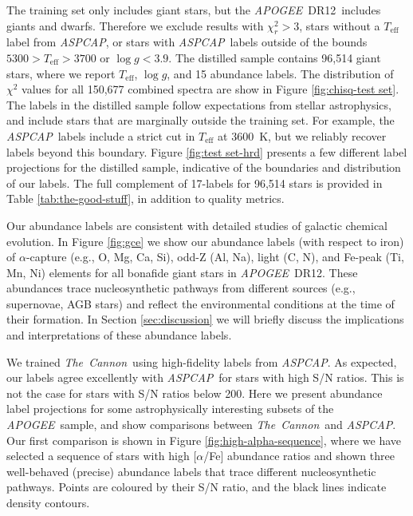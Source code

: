 \documentclass[12pt,preprint]{aastex}
\newcommand{\project}[1]{\textsl{#1}}
\newcommand{\TheCannon}{\project{The~Cannon}}
\newcommand{\acronym}[1]{{\small{#1}}}
\newcommand{\apogee}{\project{\acronym{APOGEE}}}
\newcommand{\aspcap}{\project{\acronym{ASPCAP}}}
\newcommand{\dr}{\acronym{DR12}}
\newcommand{\logg}{\log g}
\newcommand{\Teff}{T_{\mathrm{eff}}}
\begin{document}
The training set only includes giant stars, but the \apogee\ \dr\ includes 
giants and dwarfs.  Therefore we exclude results with $\chi_r^2 > 3$, stars without a $\Teff$ label from \aspcap, or stars with \aspcap\ labels outside of the bounds $5300 > \Teff > 3700$ or $\logg < 3.9$.
The distilled sample contains 96,514 giant stars, where we report $\Teff$,
$\logg$, and 15 abundance labels.  The distribution of $\chi^2$ values for
all 150,677 combined spectra are show in Figure \ref{fig:chisq-test set}.  The
labels in the distilled sample follow expectations from stellar astrophysics,
and include stars that are marginally outside the training set.  For example,
the \aspcap\ labels include a strict cut in $\Teff$ at 3600~K, but we reliably
recover labels beyond this boundary.  Figure \ref{fig:test set-hrd} presents a
few different label projections for the distilled sample, indicative of the
boundaries and distribution of our labels.  The full complement of 17-labels
for 96,514 stars is provided in Table \ref{tab:the-good-stuff}, in addition
to quality metrics. 



Our abundance labels are consistent with detailed studies
of galactic chemical evolution.  In Figure \ref{fig:gce} we show our abundance
labels (with respect to iron) of $\alpha$-capture (e.g., O, Mg, Ca, Si), odd-Z
(Al, Na), light (C, N), and Fe-peak (Ti, Mn, Ni) elements for all bonafide
giant stars in \apogee\ \dr.  These abundances trace nucleosynthetic pathways
from different sources (e.g., supernovae, AGB stars) and reflect the environmental
conditions at the time of their formation.  In Section \ref{sec:discussion} 
we will briefly discuss the implications and interpretations of these abundance
labels.


We trained \TheCannon\ using high-fidelity labels from \aspcap.  As expected,
our labels agree excellently with \aspcap\ for stars with high S/N ratios.
This is not the case for stars with S/N ratios below 200.  Here we present
abundance label projections for some astrophysically interesting subsets of
the \apogee\ sample, and show comparisons between \TheCannon\ and \aspcap.
Our first comparison is shown in Figure \ref{fig:high-alpha-sequence}, where 
we have selected a sequence of stars with
high [$\alpha$/Fe] abundance ratios and shown three well-behaved (precise)
abundance labels that trace different nucleosynthetic pathways.  Points are
coloured by their S/N ratio, and the black lines indicate density contours.
\end{document}
